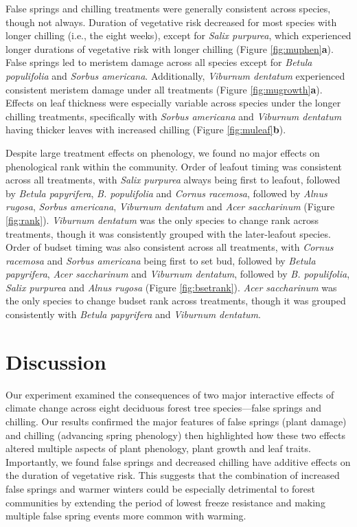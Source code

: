 \documentclass{article}\usepackage[]{graphicx}\usepackage[]{color}
\begin{document}
\begin{enumerate}
False springs and chilling treatments were generally consistent across species, though not always. Duration of vegetative risk decreased for most species with longer chilling (i.e., the eight weeks), except for \textit{Salix purpurea}, which experienced longer durations of vegetative risk with longer chilling (Figure \ref{fig:muphen}\textbf{a}). False springs led to meristem damage across all species except for \textit{Betula populifolia} and \textit{Sorbus americana}. Additionally, \textit{Viburnum dentatum} experienced consistent meristem damage under all treatments (Figure \ref{fig:mugrowth}\textbf{a}). Effects on leaf thickness were especially variable across species under the longer chilling treatments, specifically with \textit{Sorbus americana} and \textit{Viburnum dentatum} having thicker leaves with increased chilling (Figure \ref{fig:muleaf}\textbf{b}). 
  
Despite large treatment effects on phenology, we found no major effects on phenological rank within the community. Order of leafout timing was consistent across all treatments, with \textit{Salix purpurea} always being first to leafout, followed by \textit{Betula papyrifera}, \textit{B. populifolia} and \textit{Cornus racemosa}, followed by \textit{Alnus rugosa}, \textit{Sorbus americana}, \textit{Viburnum dentatum} and \textit{Acer saccharinum} (Figure \ref{fig:rank}). \textit{Viburnum dentatum} was the only species to change rank across treatments, though it was consistently grouped with the later-leafout  species. Order of budset timing was also consistent across all treatments, with \textit{Cornus racemosa} and \textit{Sorbus americana} being first to set bud, followed by \textit{Betula papyrifera}, \textit{Acer saccharinum} and \textit{Viburnum dentatum}, followed by \textit{B. populifolia}, \textit{Salix purpurea} and \textit{Alnus rugosa} (Figure \ref{fig:bsetrank}). \textit{Acer saccharinum} was the only species to change budset rank across treatments, though it was grouped consistently with \textit{Betula papyrifera} and \textit{Viburnum dentatum}.

\section*{Discussion} 
Our experiment examined the consequences of two major interactive effects of climate change across eight deciduous forest tree species---false springs and chilling. Our results confirmed the major features of false springs (plant damage) and chilling (advancing spring phenology) then highlighted how these two effects altered multiple aspects of plant phenology, plant growth and leaf traits. Importantly, we found false springs and decreased chilling have additive effects on the duration of vegetative risk. This suggests that the combination of increased false springs and warmer winters could be especially detrimental to forest communities by extending the period of lowest freeze resistance and making multiple false spring events more common with warming. 


\end{enumerate}
\end{document}
